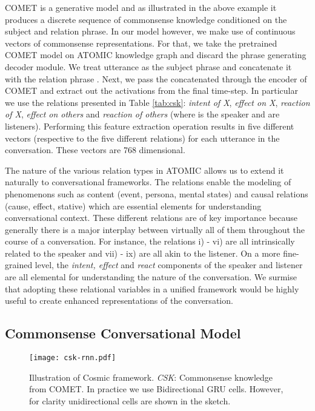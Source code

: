 \documentclass[11pt,a4paper]{article}
\begin{document}
COMET is a generative model and as illustrated in the above example it produces a discrete sequence of commonsense knowledge conditioned on the subject and relation phrase. In our model however, we make use of continuous vectors of commonsense representations. For that, we take the pretrained COMET model on ATOMIC knowledge graph and discard the phrase generating decoder module. We treat utterance  as the subject phrase and concatenate it with the relation phrase . Next, we pass the concatenated  through the encoder of COMET and extract out the activations from the final time-step. In particular we use the relations presented in Table \ref{tab:csk}: \textit{intent of X}, \textit{effect on X}, \textit{reaction of X}, \textit{effect on others} and \textit{reaction of others} (where  is the speaker and  are listeners). Performing this feature extraction operation results in five different vectors (respective to the five different relations) for each utterance in the conversation. These vectors are 768 dimensional.

The nature of the various relation types in ATOMIC allows us to extend it naturally to conversational frameworks. The relations enable the modeling of phenomenons such as content (event, persona, mental states) and causal relations (cause, effect, stative) which are essential elements for understanding conversational context. These different relations are of key importance because generally there is a major interplay between virtually all of them throughout the course of a conversation. For instance, the relations i) - vi) are all intrinsically related to the speaker and vii) - ix) are all akin to the listener. On a more fine-grained level, the \textit{intent, effect} and \textit{react} components of the speaker and listener are all elemental for understanding the nature of the conversation. We surmise that adopting these relational variables in a unified framework would be highly useful to create enhanced representations of the conversation.

\subsection{Commonsense Conversational Model}
\label{sec:model}

\begin{figure*}[ht!]
    \centering
    \texttt{[image: csk-rnn.pdf]}
    \caption{Illustration of {\sc Cosmic} framework. \textit{CSK}: Commonsense knowledge from COMET. In practice we use Bidirectional GRU cells. However, for clarity unidirectional cells are shown in the sketch.}
    \label{fig:framework}
\end{figure*}
\end{document}
